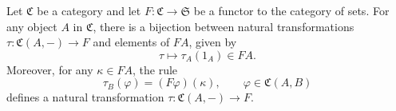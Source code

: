 Let $\mathfrak{C}$ be a category and let $F : \mathfrak{C} \to \mathfrak{S}$ be a functor to the category of sets. For any object $A$ in $\mathfrak{C}$, there is a bijection between natural transformations $\tau : \mathfrak{C}(A, -) \to F$ and elements of $FA$, given by
$$
\tau \longmapsto \tau_A(1_A) \in FA.
$$
Moreover, for any $\kappa \in FA$, the rule
$$
\tau_B(\varphi) = (F\varphi)(\kappa), \qquad \varphi \in \mathfrak{C}(A, B)
$$
defines a natural transformation $\tau : \mathfrak{C}(A, -) \to F$.
